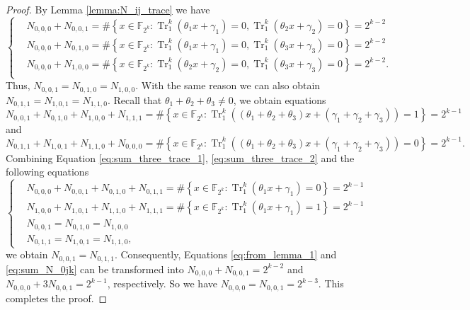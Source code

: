 \documentclass[preprint,10pt]{elsarticle}
\newcommand{\F}{\mathbb{F}}
\newcommand{\0}{\textbf{0}}
\newcommand{\1}{\textbf{1}}
\newcommand{\TRACE}{\operatorname{Tr}_1^k}
\theoremstyle{plain}
\begin{document}
    \begin{proof}
        By Lemma \ref{lemma:N_ij_trace} we have
        \begin{equation}\label{eq:from_lemma_1}\left\{\begin{alignedat}{3}
        &N_{0,0,0}+N_{0,0,1}=\#\left\{x\in\F_{2^k} : \TRACE\left(\theta_1x+\gamma_1\right)=0, \TRACE\left(\theta_2x+\gamma_2\right)=0\right\}=2^{k-2}\\
        &N_{0,0,0}+N_{0,1,0}=\#\left\{x\in\F_{2^k} : \TRACE\left(\theta_1x+\gamma_1\right)=0, \TRACE\left(\theta_3x+\gamma_3\right)=0\right\}=2^{k-2}\\
        &N_{0,0,0}+N_{1,0,0}=\#\left\{x\in\F_{2^k} : \TRACE\left(\theta_2x+\gamma_2\right)=0, \TRACE\left(\theta_3x+\gamma_3\right)=0\right\}=2^{k-2}.\\
        \end{alignedat}\right.\end{equation}
        Thus, $N_{0,0,1}=N_{0,1,0}=N_{1,0,0}$. With the same reason we can also obtain  $N_{0,1,1}=N_{1,0,1}=N_{1,1,0}$.
        Recall that $\theta_1+\theta_2+\theta_3\ne 0$, we obtain equations
        \begin{equation}\label{eq:sum_three_trace_1}
            N_{0,0,1}+N_{0,1,0}+N_{1,0,0}+N_{1,1,1}=\#\left\{x\in\F_{2^k} : \TRACE\left(\left(\theta_1+\theta_2+\theta_3\right)x+\left(\gamma_1+\gamma_2+\gamma_3\right)\right)=1\right\}=2^{k-1}
        \end{equation}
        and
        \begin{equation}\label{eq:sum_three_trace_2}
            N_{0,1,1}+N_{1,0,1}+N_{1,1,0}+N_{0,0,0}=\#\left\{x\in\F_{2^k} : \TRACE\left(\left(\theta_1+\theta_2+\theta_3\right)x+\left(\gamma_1+\gamma_2+\gamma_3\right)\right)=0\right\}=2^{k-1}.
        \end{equation}
        Combining Equation \eqref{eq:sum_three_trace_1}, \eqref{eq:sum_three_trace_2} and the following equations
        \begin{equation}\label{eq:sum_N_0jk}\left\{\begin{alignedat}{2}
            &N_{0,0,0}+N_{0,0,1}+N_{0,1,0}+N_{0,1,1}=\#\left\{x\in\F_{2^k} : \TRACE\left(\theta_1x+\gamma_1\right)=0\right\}=2^{k-1}\\
            &N_{1,0,0}+N_{1,0,1}+N_{1,1,0}+N_{1,1,1}=\#\left\{x\in\F_{2^k} : \TRACE\left(\theta_1x+\gamma_1\right)=1\right\}=2^{k-1}\\
            &N_{0,0,1}=N_{0,1,0}=N_{1,0,0}\\
            &N_{0,1,1}=N_{1,0,1}=N_{1,1,0},
        \end{alignedat}\right.\end{equation}
        we obtain $N_{0,0,1}=N_{0,1,1}$.
        Consequently, Equations \eqref{eq:from_lemma_1} and \eqref{eq:sum_N_0jk} can be transformed into
        $N_{0,0,0}+N_{0,0,1}=2^{k-2}$ and $N_{0,0,0}+3N_{0,0,1}=2^{k-1}$, respectively.
        So we have $N_{0,0,0}=N_{0,0,1}=2^{k-3}$. This completes the proof.
    \end{proof}
\end{document}
